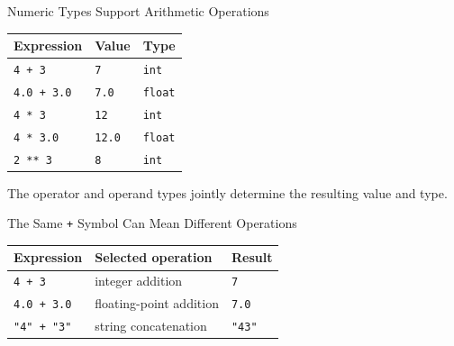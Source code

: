 \documentclass[aspectratio=169,10pt]{beamer}
\begin{document}
\begin{frame}{Numeric Types Support Arithmetic Operations}

  \begin{center}

    \begin{tabular}{l l l}
      \textbf{Expression} & \textbf{Value} & \textbf{Type} \\
      \hline
      \texttt{4 + 3} & \texttt{7} & \texttt{int} \\
      \texttt{4.0 + 3.0} & \texttt{7.0} & \texttt{float} \\
      \texttt{4 * 3} & \texttt{12} & \texttt{int} \\
      \texttt{4 * 3.0} & \texttt{12.0} & \texttt{float} \\
      \texttt{2 ** 3} & \texttt{8} & \texttt{int} \\
    \end{tabular}

  \end{center}

  \begin{exampleblockcp}

    The operator and operand types jointly determine the resulting value and type.

  \end{exampleblockcp}

\end{frame}

\begin{frame}{The Same \texttt{+} Symbol Can Mean Different Operations}

  \begin{center}

    \begin{tabular}{l l l}
      \textbf{Expression} & \textbf{Selected operation} & \textbf{Result} \\
      \hline
      \texttt{4 + 3} & integer addition & \texttt{7} \\
      \texttt{4.0 + 3.0} & floating-point addition & \texttt{7.0} \\
      \texttt{"4" + "3"} & string concatenation & \texttt{"43"} \\
    \end{tabular}

  \end{center}

  \vspace{0.10in}

\end{frame}
\end{document}
